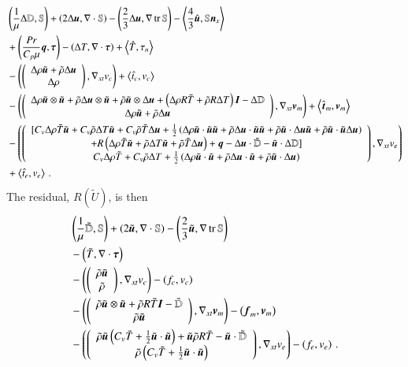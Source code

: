 \documentclass[preprint,12pt]{elsarticle}
\begin{document}
\begin{equation}
\label{eq:compressibleJacobian}
\begin{aligned}
	&\LRp{\frac{1}{\mu}\Delta\mathbb{D},\mathbb{S}}+\LRp{2\Delta\bfu,\Div\mathbb{S}}-\LRp{\frac{2}{3}\Delta\bfu,\Grad\trace{\mathbb{S}}}
	-\LRa{\frac{4}{3}\hat\bfu,\mathbb{S}\bfn_x}\\
	&+\LRp{\frac{Pr}{C_p\mu}\bfq,\bftau}-\LRp{\Delta T,\Div\bftau}+\LRa{\hat T,\tau_n}\\
	&-\LRp{\vecttwo{\Delta\rho\tilde\bfu+\tilde\rho\Delta\bfu}
	{\Delta\rho},\Gradxt v_c}
	+\LRa{\hat t_c,v_c}\\
	&-\LRp{\vecttwo{\Delta\rho\tilde\bfu\otimes\tilde\bfu+\tilde\rho\Delta\bfu\otimes\tilde\bfu+\tilde\rho\tilde\bfu\otimes\Delta\bfu
	+\LRp{\Delta\rho R\tilde T+\tilde\rho R\Delta T}\bfI-\Delta\mathbb{D}}
	{\Delta\rho\tilde\bfu+\tilde\rho\Delta\bfu},\Gradxt\bfv_m}
	+\LRa{\hat\bft_m,\bfv_m}\\
	&-\LRp{\vectthree{[C_v\Delta\rho\tilde T\tilde\bfu+C_v\tilde\rho\Delta T\tilde\bfu+C_v\tilde\rho\tilde T\Delta\bfu
	+\frac{1}{2}\LRp{\Delta\rho\tilde\bfu\cdot\tilde\bfu\tilde\bfu+\tilde\rho\Delta\bfu\cdot\tilde\bfu\tilde\bfu
	+\tilde\rho\tilde\bfu\cdot\Delta\bfu\tilde\bfu+\tilde\rho\tilde\bfu\cdot\tilde\bfu\Delta\bfu}}
	{+R\LRp{\Delta\rho\tilde T\tilde\bfu+\tilde\rho\Delta T\tilde\bfu+\tilde\rho\tilde T\Delta\bfu}
	+\bfq-\Delta\bfu\cdot\tilde{\mathbb{D}}-\tilde\bfu\cdot\Delta\mathbb{D}]}
	{C_v\Delta\rho\tilde T+C_v\tilde\rho\Delta T
	+\frac{1}{2}\LRp{\Delta\rho\tilde\bfu\cdot\tilde\bfu+\tilde\rho\Delta\bfu\cdot\tilde\bfu+\tilde\rho\tilde\bfu\cdot\Delta\bfu}},\Gradxt v_e}\\
	&+\LRa{\hat t_e,v_e}\,.
\end{aligned}
\end{equation}
\normalsize
The residual, $R(\tilde U)$, is then
\begin{equation}
\begin{aligned}
	&\left( \frac{1}{\mu}\tilde{\mathbb{D}},\mathbb{S} \right)+\left( 2\tilde{\boldsymbol u},\nabla\cdot\mathbb{S} \right)-\left( \frac{2}{3}\tilde{\boldsymbol u},\nabla\operatorname*{tr}{\mathbb{S}} \right)\\
	&-\left( \tilde T,\nabla\cdot\boldsymbol\tau \right)\\
	&-\left( \left( \begin{array}{c} \tilde\rho\tilde{\boldsymbol u}\\ \tilde\rho\\ \end{array} \right),\nabla_{xt} v_c \right)-\left( f_c,v_c \right)\\
	&-\left( \left( \begin{array}{c} \tilde\rho\tilde{\boldsymbol u}\otimes\tilde{\boldsymbol u}+\tilde\rho R\tilde T\boldsymbol I-\tilde{\mathbb{D}}\\ \tilde\rho\tilde{\boldsymbol u}\\ \end{array} \right),
	\nabla_{xt}\boldsymbol v_m \right)-\left( \boldsymbol f_m,\boldsymbol v_m \right)\\
	&-\left( \left( \begin{array}{c} \tilde\rho\tilde{\boldsymbol u}\left( C_v\tilde T+\frac{1}{2}\tilde{\boldsymbol u}\cdot\tilde{\boldsymbol u} \right)+\tilde{\boldsymbol u}\tilde\rho R\tilde T
	-\tilde{\boldsymbol u}\cdot\tilde{\mathbb{D}}\\ \tilde\rho\left( C_v\tilde T+\frac{1}{2}\tilde{\boldsymbol u}\cdot\tilde{\boldsymbol u} \right)\\ \end{array} \right),
	\nabla_{xt} v_e \right)-\left( f_e,v_e \right)\,.
\end{aligned}
\end{equation}
\end{document}
